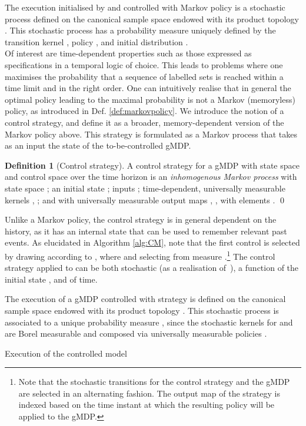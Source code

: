 \documentclass[letterpaper, 10 pt, conference]{amsart}
\theoremstyle{definition}
\newtheorem{defn}[definition]{Definition}
\theoremstyle{example}
\theoremstyle{remark}
\begin{document}
The execution
 initialised by  and controlled with Markov policy  is a stochastic process defined on the canonical sample space  endowed with its product topology . 
This stochastic process has a probability measure  uniquely defined by the transition kernel , policy , 
and initial distribution  \cite[Prop. 7.45]{bible}.  \\
Of interest are time-dependent properties such as those expressed as specifications in a temporal logic of choice.   
This leads to problems where one maximises the probability that a sequence of labelled sets is reached within a time limit and in the right order. 
One can intuitively realise that in general the optimal policy leading to the maximal probability is not a Markov (memoryless) policy, as introduced in Def. \ref{def:markovpolicy}. 
We introduce the notion of a control strategy, and define it as a broader, memory-dependent version of the Markov policy above. 
This strategy is formulated as a Markov process that takes as an input the state of the to-be-controlled gMDP. 
\begin{defn}[Control strategy]\label{def:CS}
A control strategy  for a gMDP  with state space  and control space  over the time horizon  is an \emph{inhomogenous Markov process} with 
state space ;  
an initial state ;  inputs  ; time-dependent, universally measurable kernels , ;  
and with universally measurable output maps , ,
with elements . \qed  
\end{defn}
Unlike a Markov policy, the control strategy is in general dependent on the history, as it has an internal state that can be used to remember relevant past events.  
As elucidated in Algorithm \ref{alg:CM}, 
note that the first control  is selected by drawing  according to , 
where  and selecting  from measure .\footnote{Note that the stochastic transitions for the control strategy and the gMDP are selected in an alternating fashion. The output map of the strategy is indexed based on the time instant at which the resulting policy will be applied to the gMDP. }
The control strategy applied to  can be both stochastic (as a realisation of \mbox{\,}), 
a function of the initial state , 
and of time.  

The execution  of a gMDP  controlled with strategy  is defined on the canonical sample space  endowed with its product topology . 
This stochastic process is associated to a unique probability measure , 
since the stochastic kernels  for  and  are Borel measurable and composed via universally measurable policies \cite[Prop. 7.45]{bible}. 
\begin{algorithm}[htp]
\caption{Execution of the controlled model }\label{alg:CM}
\begin{algorithmic}
\WHILE{}
\ENDWHILE
\end{algorithmic}
\end{algorithm}
\end{document}
